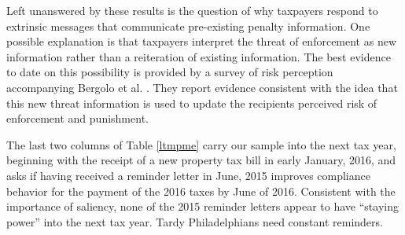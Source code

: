 \documentclass[12pt]{article}
\begin{document}
Left unanswered by these results is the question of why taxpayers respond
to extrinsic messages that communicate pre-existing penalty information.
One possible explanation is that taxpayers interpret the threat of enforcement as new
information rather than a reiteration of existing information. The
best evidence to date on this possibility is provided by a survey of risk perception
accompanying Bergolo et al. \citeyear{bergolo2017tax}. They report evidence consistent with the idea that
this new threat information is used to update the recipients perceived
risk of enforcement and punishment.

The last two columns of Table \ref{ltmpme} carry our sample into the
next tax year, beginning with the receipt of a new property tax bill
in early January, 2016, and asks if having received a reminder letter
in June, 2015 improves compliance behavior for the payment of the 2016
taxes by June of 2016.  Consistent with the importance of saliency,
none of the 2015 reminder letters appear to have ``staying power''
into the next tax year.  Tardy Philadelphians need constant
reminders.
\end{document}
